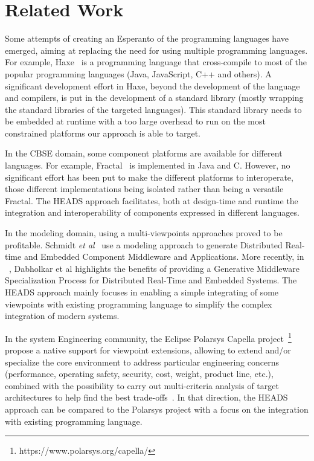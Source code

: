 \section{Related Work}

Some attempts of creating an Esperanto of the programming languages have emerged, aiming at replacing the need for using multiple programming languages. For example, Haxe~\cite{dasnois2011haxe} is a programming language that cross-compile to most of the popular programming languages (Java, JavaScript, C++ and others). A significant development effort in Haxe, beyond the development of the language and compilers, is put in the development of a standard library (mostly wrapping the standard libraries of the targeted languages). This standard library needs to be embedded at runtime with a too large overhead to run on the most constrained platforms our approach is able to target. 

In the CBSE domain, some component platforms are available for different languages. For example, Fractal~\cite{bruneton2006fractal} is implemented in Java and C. However, no significant effort has been put to make the different platforms to interoperate, those different implementations being isolated rather than being a versatile Fractal. The HEADS approach facilitates, both at design-time and runtime the integration and interoperability of components expressed in different languages.

In the modeling domain, using a multi-viewpoints approaches proved to be profitable. Schmidt {\em et al}~\cite{DBLP:conf/middleware/GokhaleSLNW03} use a modeling approach to generate Distributed Real-time and Embedded Component Middleware and Applications. More recently, in  ~\cite{5753608}, Dabholkar et al highlights the benefits of providing a Generative Middleware Specialization Process for Distributed Real-Time and Embedded Systems.  The HEADS approach  mainly focuses in enabling a simple integrating of some viewpoints with existing programming language to simplify the complex integration of modern systems. 

In the system Engineering community, the Eclipse Polarsys Capella project~\footnote{https://www.polarsys.org/capella/} propose a native support for viewpoint extensions, allowing to extend and/or specialize the core environment to address particular engineering concerns (performance, operating safety, security, cost, weight, product line, etc.), combined with the possibility to carry out multi-criteria analysis of target architectures to help find the best trade-offs~\cite{voirin2013arcadia}. In that direction, the HEADS approach can be compared to the Polarsys project with a focus on the integration with existing programming language.

